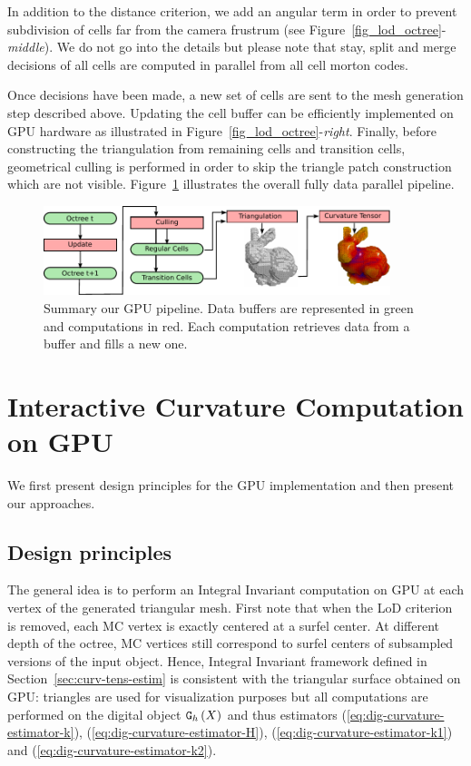 \documentclass{llncs}
\begin{document}
%
In addition to the distance criterion, we add an angular term in order
to prevent subdivision of cells far from the camera frustrum (see
Figure~\ref{fig_lod_octree}-\emph{middle}). We do not go into the
details but please note that stay, split and merge decisions of all cells are computed in
parallel from all cell morton codes.

Once decisions have been made, a new set of cells are sent to the mesh
generation step described above. Updating the cell buffer can be
efficiently implemented on GPU hardware as illustrated in
Figure~\ref{fig_lod_octree}-\emph{right}.  Finally, before
constructing the triangulation from remaining cells and transition
cells, geometrical culling is performed in order to skip the triangle
patch construction which are not visible. Figure~\ref{fig_pipeline}
illustrates the overall fully data parallel pipeline.

\begin{figure}[!htbp]
  \centering
  \includegraphics[width=0.9\textwidth]{figs/pipeline2}
  \caption{ Summary our GPU pipeline. Data buffers are
    represented in green and computations in red. Each computation
    retrieves data from a buffer and fills a new one. }
  \label{fig_pipeline}
\end{figure}

\section{Interactive Curvature Computation on GPU}
\label{sec:inter-visu-gpu}

We first present design principles for the GPU implementation and then
present our approaches.

\subsection{Design principles}

The general idea is to perform an Integral Invariant computation on
GPU at each vertex of the generated triangular mesh. First note that
when the LoD criterion is removed, each MC vertex is exactly centered at
a surfel center. At different depth of the octree, MC vertices still
correspond to surfel centers of subsampled versions of the input
object. Hence, Integral Invariant framework defined in
Section~\ref{sec:curv-tens-estim} is consistent with the triangular
surface obtained on GPU: triangles are used for visualization purposes
but all computations are performed on the digital object $\mathtt{G}_{h}\left(X\right)$ and thus
estimators
(\ref{eq:dig-curvature-estimator-k}),
(\ref{eq:dig-curvature-estimator-H}), (\ref{eq:dig-curvature-estimator-k1})
and (\ref{eq:dig-curvature-estimator-k2}).
\end{document}
